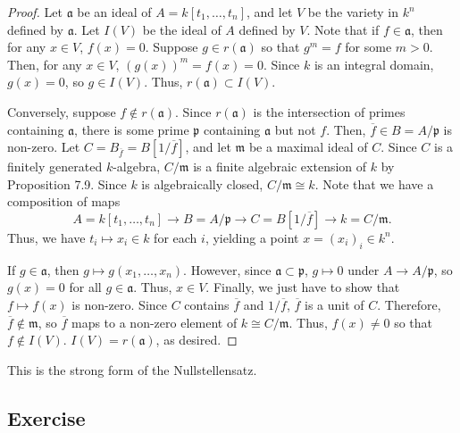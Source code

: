 \begin{proof}
Let $\mathfrak{a}$ be an ideal of $A = k[t_1,\ldots,t_n]$, and let $V$ be the variety in $k^n$ defined by $\mathfrak{a}$. Let $I(V)$ be the ideal of $A$
defined by $V$. Note that if $f \in \mathfrak{a}$, then for any $x \in V$, $f(x) = 0$. Suppose $g \in r(\mathfrak{a})$ so that $g^m = f$ for some $m > 0$. 
Then, for any $x \in V$, $(g(x))^m = f(x) = 0$. Since $k$ is an integral domain, $g(x) = 0$, so $g \in I(V)$. Thus, $r(\mathfrak{a}) \subset I(V)$.

Conversely, suppose $f \not\in r(\mathfrak{a})$. Since $r(\mathfrak{a})$ is the intersection of primes containing $\mathfrak{a}$, there is some prime $\mathfrak{p}$
containing $\mathfrak{a}$ but not $f$. Then, $\overline{f} \in B = A/\mathfrak{p}$ is non-zero. Let $C = B_{\overline{f}} = B[1/\overline{f}]$, and let $\mathfrak{m}$
be a maximal ideal of $C$. Since $C$ is a finitely generated $k$-algebra, $C/\mathfrak{m}$ is a finite algebraic extension of $k$ by Proposition 7.9. Since $k$ is 
algebraically closed, $C/\mathfrak{m} \cong k$. Note that we have a composition of maps
$$A = k[t_1,\ldots,t_n] \to B = A/\mathfrak{p} \to C = B[1/\overline{f}] \to k = C/\mathfrak{m}.$$
Thus, we have $t_i \mapsto x_i \in k$ for each $i$, yielding a point $x = (x_i)_i \in k^n$.

If $g \in \mathfrak{a}$, then $g \mapsto g(x_1,\ldots,x_n)$. However, since $\mathfrak{a} \subset \mathfrak{p}$, $g \mapsto 0$ under $A \to A/\mathfrak{p}$,
so $g(x) = 0$ for all $g \in \mathfrak{a}$. Thus, $x \in V$. Finally, we just have to show that $f \mapsto f(x)$ is non-zero. Since $C$ contains $\overline{f}$
and $1/\overline{f}$, $\overline{f}$ is a unit of $C$. Therefore, $\overline{f} \not\in \mathfrak{m}$, so $\overline{f}$ maps to a non-zero element of $k \cong C/\mathfrak{m}$.
Thus, $f(x) \neq 0$ so that $f \not\in I(V)$. $I(V) = r(\mathfrak{a})$, as desired.
\end{proof}

\begin{remark}
This is the strong form of the Nullstellensatz.
\end{remark}

\subsection{Exercise}\label{7.15}


